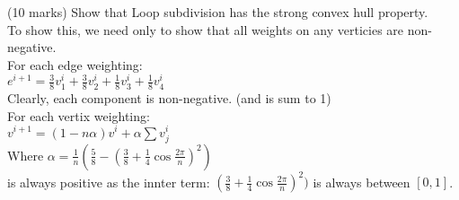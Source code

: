 (10 marks) Show that Loop subdivision has the strong convex hull property. \\

To show this, we need only to show that all weights on any verticies are non-negative. \\
For each edge weighting:\\ 
$e^{i+1} = \frac{3}{8}v_1^i + \frac{3}{8} v_2^i + \frac{1}{8} v_3^i + \frac{1}{8} v_4^i$ \\
Clearly, each component is non-negative. (and is sum to 1)\\
For each vertix weighting: \\
$v^{i+1} = (1 - n \alpha )v^i + \alpha \sum v^i_j $ \\
Where $\alpha = \frac{1}{n} ( \frac{5}{8} - ( \frac{3}{8} + \frac{1}{4} \cos \frac{2 \pi }{n})^2 )$ \\
is always positive as the innter term: $( \frac{3}{8} + \frac{1}{4} \cos \frac{2 \pi }{n})^2 )$ is always between $[0,1]$.


